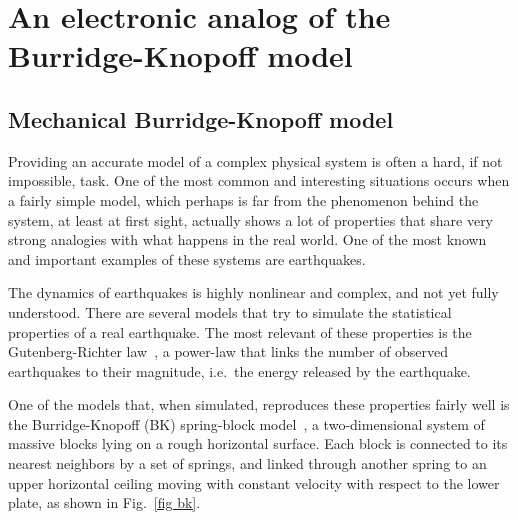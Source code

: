 \chapter{An electronic analog of the Burridge-Knopoff model}\label{chap: electronic analog of bk}

\section{Mechanical Burridge-Knopoff model}\label{sec: mechanical bk}

Providing an accurate model of a complex physical system is often a hard, if not
impossible, task. One of the most common and interesting situations occurs when a
fairly simple model, which perhaps is far from the phenomenon
behind the system, at least at first sight, actually shows a lot of properties that share
very strong analogies with what happens in the real world. One of the most known
and important examples of these systems are earthquakes.

The dynamics of earthquakes is highly nonlinear and complex, and not yet fully
understood. There are several models that try to simulate the statistical properties of
a real earthquake. The most relevant of these properties is the Gutenberg-Richter law~\cite{gutenberg1956energy},
a power-law that links the number of observed earthquakes to their magnitude,
i.e.\ the energy released by the earthquake.

One of the models that, when simulated, reproduces these properties fairly well is
the Burridge-Knopoff (BK) spring-block model~\cite{ref:bk}, a two-dimensional system of massive blocks
lying on a rough horizontal surface. Each block is connected to its nearest neighbors by a set of springs,
and linked through another spring to an upper horizontal ceiling moving with constant velocity with respect to the lower plate,
as shown in Fig.~\ref{fig bk}.

